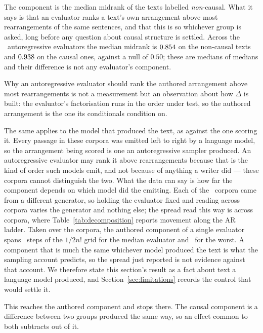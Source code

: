 \documentclass[11pt]{article}
\begin{document}
The component is the median midrank of the texts labelled
\emph{non}-causal.  What it says is that an
evaluator ranks a text's own arrangement above most rearrangements of the
same sentences, and that this is so whichever group is asked, long before
any question about causal structure is settled.  Across the
\TrendNEval\ autoregressive evaluators the median midrank is
$0.854$ on the non-causal texts and $0.938$ on the causal
ones, against a null of $0.50$; these are medians of medians and their
difference is not any evaluator's component.

Why an autoregressive evaluator should rank the authored arrangement above
most rearrangements is not a measurement but an observation about how
$\Delta$ is built: the evaluator's factorisation runs in the order under
test, so the authored arrangement is the one its conditionals condition on.

The same applies to the model that produced the text, as against the one
scoring it.  Every passage in these corpora was emitted left to right
by a language model, so the arrangement being scored is one an
autoregressive sampler produced.  An autoregressive evaluator may rank it
above rearrangements because that is the kind of order such models emit,
and not because of anything a writer did --- these corpora cannot
distinguish the two.  What the data can say is how far the component
depends on which model did the emitting.  Each of the \AuthoredCorpNGen\ corpora came
from a different generator, so holding the evaluator fixed and reading
across corpora varies the generator and nothing else; the spread
read this way is across corpora, where Table~\ref{tab:decomposition} reports
movement along the AR ladder.  Taken over the corpora, the authored
component of a single evaluator spans \AuthoredCorpSpreadSteps\ steps of
the $1/2n!$ grid for the median evaluator and \AuthoredCorpSpreadMax\ for
the worst.  A component that is much the
same whichever model produced the text is what the sampling account
predicts, so the spread just reported is not evidence against that
account.  We therefore state this
section's result as a fact about text a language model produced, and
Section~\ref{sec:limitations} records the control that would settle it.

This reaches the authored component and stops there.  The causal component
is a difference between two groups produced the same way, so an effect
common to both subtracts out of it.
\end{document}
